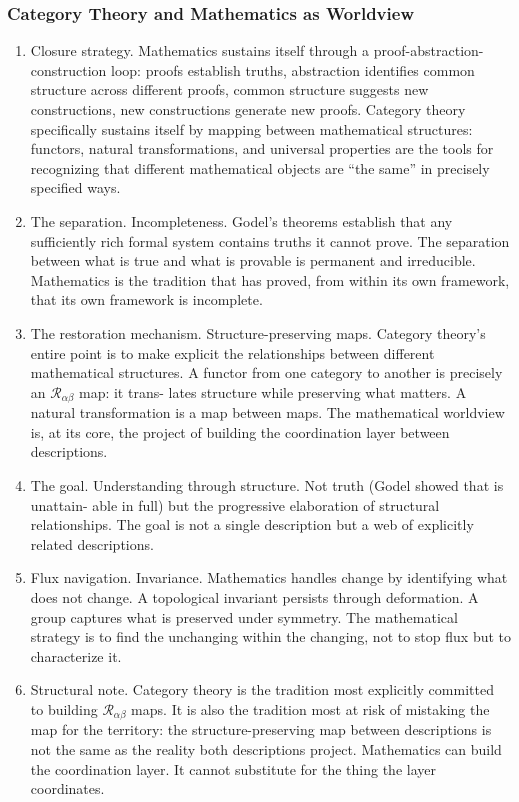 \documentclass[
]{article}
\begin{document}
\subsubsection{Category Theory and Mathematics as
Worldview}\label{category-theory-and-mathematics-as-worldview}

\begin{enumerate}
\def\labelenumi{\arabic{enumi}.}
\setcounter{enumi}{123}
\item
  Closure strategy. Mathematics sustains itself through a
  proof-abstraction- construction loop: proofs establish truths,
  abstraction identifies common structure across different proofs,
  common structure suggests new constructions, new constructions
  generate new proofs. Category theory specifically sustains itself by
  mapping between mathematical structures: functors, natural
  transformations, and universal properties are the tools for
  recognizing that different mathematical objects are ``the same'' in
  precisely specified ways.
\item
  The separation. Incompleteness. Godel's theorems establish that any
  sufficiently rich formal system contains truths it cannot prove. The
  separation between what is true and what is provable is permanent and
  irreducible. Mathematics is the tradition that has proved, from within
  its own framework, that its own framework is incomplete.
\item
  The restoration mechanism. Structure-preserving maps. Category
  theory's entire point is to make explicit the relationships between
  different mathematical structures. A functor from one category to
  another is precisely an \(\mathcal{R}_{\alpha\beta}\) map: it trans-
  lates structure while preserving what matters. A natural
  transformation is a map between maps. The mathematical worldview is,
  at its core, the project of building the coordination layer between
  descriptions.
\item
  The goal. Understanding through structure. Not truth (Godel showed
  that is unattain- able in full) but the progressive elaboration of
  structural relationships. The goal is not a single description but a
  web of explicitly related descriptions.
\item
  Flux navigation. Invariance. Mathematics handles change by identifying
  what does not change. A topological invariant persists through
  deformation. A group captures what is preserved under symmetry. The
  mathematical strategy is to find the unchanging within the changing,
  not to stop flux but to characterize it.
\item
  Structural note. Category theory is the tradition most explicitly
  committed to building \(\mathcal{R}_{\alpha\beta}\) maps. It is also
  the tradition most at risk of mistaking the map for the territory: the
  structure-preserving map between descriptions is not the same as the
  reality both descriptions project. Mathematics can build the
  coordination layer. It cannot substitute for the thing the layer
  coordinates.
\end{enumerate}
\end{document}
